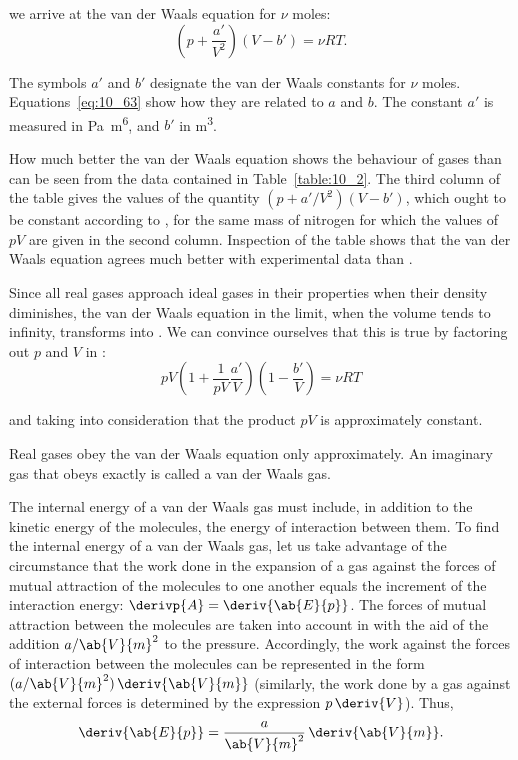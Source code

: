 \noindent
we arrive at the van der Waals equation for $\nu$ moles:
\begin{equation}\label{eq:10_64}
	\left(p + \frac{a'}{V^2}\right) (V - b') = \nu RT.
\end{equation}

\noindent
The symbols $a'$ and $b'$ designate the van der Waals constants for $\nu$ moles. Equations~\eqref{eq:10_63} show how they are related to $a$ and $b$. The constant $a'$ is measured in \si{\pascal~\metre^6}, and $b'$ in \si{\metre\cubed}.

How much better the van der Waals equation shows the behaviour of gases than  can be seen from the data contained in Table~\ref{table:10_2}. The third column of the table gives the values of the quantity $(p+a'/V^2)(V-b')$, which ought to be constant according to , for the same mass of nitrogen for which the values of $pV$ are given in the second column. Inspection of the table shows that the van der Waals equation agrees much better with experimental data than .

Since all real gases approach ideal gases in their properties when their density diminishes, the van der Waals equation in the limit, when the volume tends to infinity, transforms into . We can convince ourselves that this is true by factoring out $p$ and $V$ in :
\begin{equation*}
	pV\left(1 + \frac{1}{pV}\frac{a'}{V}\right)\left(1 - \frac{b'}{V}\right) = \nu RT
\end{equation*}

\noindent
and taking into consideration that the product $pV$ is approximately constant.

Real gases obey the van der Waals equation only approximately. An imaginary gas that obeys  exactly is called a van der Waals gas.

The internal energy of a van der Waals gas must include, in addition to the kinetic energy of the molecules, the energy of interaction between them. To find the internal energy of a van der Waals gas, let us take advantage of the circumstance that the work done in the expansion of a gas against the forces of mutual attraction of the molecules to one another equals the increment of the interaction energy: $\derivp{A}= \deriv{\ab{E}{p}}$. The forces of mutual attraction between the molecules are taken into account in  with the aid of the addition $a/\ab{V}{m}^2$ to the pressure. Accordingly, the work against the forces of interaction between the molecules can be represented in the form $(a/\ab{V}{m}^2)\,\deriv{\ab{V}{m}}$ (similarly, the work done by a gas against the external forces is determined by the expression $p\,\deriv{V}$). Thus,
\begin{equation*}
	\deriv{\ab{E}{p}} = \frac{a}{\ab{V}{m}^2}\,\deriv{\ab{V}{m}}.
\end{equation*}

